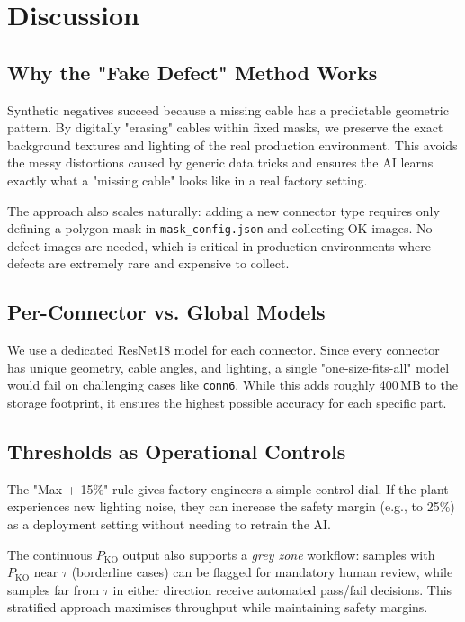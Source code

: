 \documentclass[11pt,a4paper]{article}
\begin{document}
\section{Discussion}

\subsection{Why the "Fake Defect" Method Works}

Synthetic negatives succeed because a missing cable has a predictable geometric pattern. By digitally "erasing" cables within fixed masks, we preserve the exact background textures and lighting of the real production environment. This avoids the messy distortions caused by generic data tricks and ensures the AI learns exactly what a "missing cable" looks like in a real factory setting.

The approach also scales naturally: adding a new connector type requires only defining a polygon mask in \texttt{mask\_config.json} and collecting OK images. No defect images are needed, which is critical in production environments where defects are extremely rare and expensive to collect.

\subsection{Per-Connector vs. Global Models}

We use a dedicated ResNet18 model for each connector. Since every connector has unique geometry, cable angles, and lighting, a single "one-size-fits-all" model would fail on challenging cases like \texttt{conn6}. While this adds roughly 400\,MB to the storage footprint, it ensures the highest possible accuracy for each specific part.

\subsection{Thresholds as Operational Controls}

The "Max + 15\%" rule gives factory engineers a simple control dial. If the plant experiences new lighting noise, they can increase the safety margin (e.g., to 25\%) as a deployment setting without needing to retrain the AI. 

The continuous $P_{\mathrm{KO}}$ output also supports a \emph{grey zone} workflow: samples with $P_{\mathrm{KO}}$ near $\tau$ (borderline cases) can be flagged for mandatory human review, while samples far from $\tau$ in either direction receive automated pass/fail decisions. This stratified approach maximises throughput while maintaining safety margins.
\end{document}

